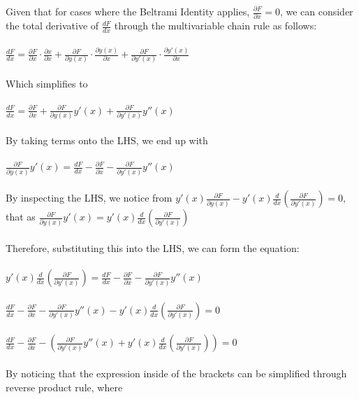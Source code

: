 \documentclass[12pt]{report}
\begin{document}
Given that for cases where the Beltrami Identity applies, \(\frac{\partial F}{\partial x} = 0\), we can consider the total derivative of \(\frac{dF}{dx}\) through the multivariable chain rule as follows:
\\
\\
\(\frac{dF}{dx} = \frac{\partial F}{\partial x} \cdot \frac{\partial x}{\partial x} + \frac{\partial F}{\partial y(x)} \cdot \frac{\partial y(x)}{\partial x} + \frac{\partial F}{\partial y'(x)} \cdot \frac{\partial y'(x)}{\partial x}\)
\\
\\
Which simplifies to
\\
\\
\(\frac{dF}{dx} = \frac{\partial F}{\partial x} + \frac{\partial F}{\partial y(x)} y'(x) + \frac{\partial F}{\partial y'(x)}y''(x)\)
\\
\\
By taking terms onto the LHS, we end up with
\\
\\
\( \frac{\partial F}{\partial y(x)} y'(x) = \frac{dF}{dx} - \frac{\partial F}{\partial x} - \frac{\partial F}{\partial y'(x)}y''(x)\)
\\
\\
By inspecting the LHS, we notice from \(y'(x)\frac{\partial F}{\partial y(x)} - y'(x)\frac{d}{dx}(\frac{\partial F}{\partial y'(x)}) = 0\), that as \( \frac{\partial F}{\partial y(x)} y'(x) = y'(x)\frac{d}{dx}(\frac{\partial F}{\partial y'(x)})\)
\\
\\
Therefore, substituting this into the LHS, we can form the equation:
\\
\\
\(y'(x)\frac{d}{dx}(\frac{\partial F}{\partial y'(x)}) = \frac{dF}{dx} - \frac{\partial F}{\partial x} - \frac{\partial F}{\partial y'(x)}y''(x)\)
\\
\\
\implies \( \frac{dF}{dx} - \frac{\partial F}{\partial x} - \frac{\partial F}{\partial y'(x)}y''(x) - y'(x)\frac{d}{dx}(\frac{\partial F}{\partial y'(x)}) = 0\)
\\
\\
\implies \( \frac{dF}{dx} - \frac{\partial F}{\partial x} - (\frac{\partial F}{\partial y'(x)}y''(x) + y'(x)\frac{d}{dx}(\frac{\partial F}{\partial y'(x)})) = 0\)
\\
\\
By noticing that the expression inside of the brackets can be simplified through reverse product rule, where
\end{document}
